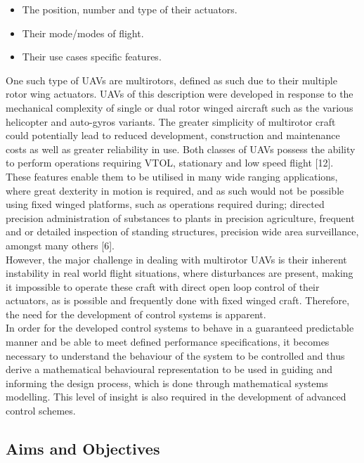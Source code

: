 \documentclass[12pt,a4paper,twoside]{report}
\begin{document}
			\begin{itemize}
				\item
					The position, number and type of their actuators.
				\item 
					Their mode/modes of flight. 
				\item 
					Their use cases specific features.
			\end{itemize}
			\space
			One such type of UAVs are multirotors, defined as such due to their multiple rotor wing actuators. UAVs of this description were developed in response to the mechanical complexity of single or dual rotor winged aircraft such as the various helicopter and auto-gyros variants. The greater simplicity of multirotor craft could potentially lead to reduced development, construction and maintenance costs as well as greater reliability in use. Both classes of UAVs possess the ability to perform operations requiring VTOL, stationary and low speed flight [12].
			\\
			These features enable them to be utilised in many wide ranging applications, where great dexterity in motion is required, and as such would not be possible using fixed winged platforms, such as operations required during; directed precision administration of substances to plants in precision agriculture, frequent and or detailed inspection of standing structures, precision wide area surveillance, amongst many others [6].
			\\
			However, the major challenge in dealing with multirotor UAVs is their inherent instability in real world flight situations, where disturbances are present, making it impossible to operate these craft with direct open loop control of their actuators, as is possible and frequently done with fixed winged craft. Therefore, the need for the development of control systems is apparent. 
			\\
			In order for the developed control systems to behave in a guaranteed predictable manner and be able to meet defined performance specifications, it becomes necessary to understand the behaviour of the system to be controlled and thus derive a mathematical behavioural representation to be used in guiding and informing the design process, which is done through mathematical systems modelling. This level of insight is also required in the development of advanced control schemes.
		
		
		\subsection{Aims and Objectives}
			
\end{document}
